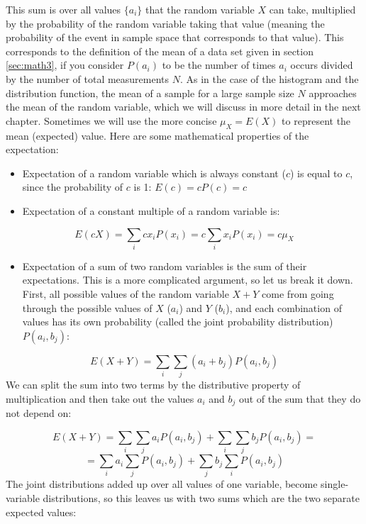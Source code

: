 \documentclass[
]{book}
\providecommand{\tightlist}{%
  \setlength{\itemsep}{0pt}\setlength{\parskip}{0pt}}
\theoremstyle{definition}
\theoremstyle{definition}
\theoremstyle{definition}
\theoremstyle{remark}
\begin{document}
This sum is over all values \(\{a_i\}\) that the random variable \(X\) can take, multiplied by the probability of the random variable taking that value (meaning the probability of the event in sample space that corresponds to that value). This corresponds to the definition of the mean of a data set given in section \ref{sec:math3}, if you consider \(P(a_i)\) to be the number of times \(a_i\) occurs divided by the number of total measurements \(N\). As in the case of the histogram and the distribution function, the mean of a sample for a large sample size \(N\) approaches the mean of the random variable, which we will discuss in more detail in the next chapter. Sometimes we will use the more concise \(\mu_X = E(X)\) to represent the mean (expected) value. Here are some mathematical properties of the expectation:

\begin{itemize}
\tightlist
\item
  Expectation of a random variable which is always constant (\(c\)) is equal to \(c\), since the probability of \(c\) is 1: \(E(c) = cP(c) = c\)
\item
  Expectation of a constant multiple of a random variable is:
\end{itemize}

\[E(cX) = \sum_i c x_iP(x_i) = c \sum_i x_iP(x_i) = c \mu_X\]

\begin{itemize}
\tightlist
\item
  Expectation of a sum of two random variables is the sum of their expectations. This is a more complicated argument, so let us break it down. First, all possible values of the random variable \(X+Y\) come from going through the possible values of \(X\) (\(a_i\)) and \(Y\) (\(b_i\)), and each combination of values has its own probability (called the joint probability distribution) \(P(a_i, b_j)\):
\end{itemize}

\[E(X+Y) = \sum_i \sum_j (a_i+b_j) P(a_i, b_j)\]
We can split the sum into two terms by the distributive property of multiplication and then take out the values \(a_i\) and \(b_j\) out of the sum that they do not depend on:

\[E(X+Y) = \sum_i \sum_j a_i P(a_i, b_j) + \sum_i \sum_j b_j P(a_i, b_j)=\]
\[=\sum_i a_i  \sum_j  P(a_i, b_j) +  \sum_j b_j \sum_i P(a_i, b_j) \]
The joint distributions added up over all values of one variable, become single-variable distributions, so this leaves us with two sums which are the two separate expected values:
\end{document}
